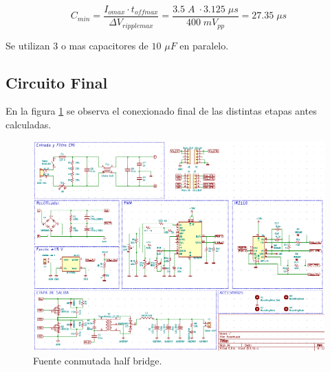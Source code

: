 \documentclass[11pt, a4paper]{article}
\begin{document}
\begin{equation}
C_{min} = \frac{I_{omax} \cdot t_{offmax}}{\Delta V_{ripplemax}} = \frac{3.5 \; A \; \cdot 3.125 \; \mu s}{400 \; mV_{pp}} = 27.35 \; \mu s
\label{CO}
\end{equation} 

Se utilizan 3 o mas capacitores de $10$ $\mu F$ en paralelo.

\subsection{Circuito Final}
En la figura \ref{fuente} se observa el conexionado final de las distintas etapas antes calculadas.

\begin{figure}[H]
	\centering
	\includegraphics[angle = 90, height = 19 cm]{Imagenes/Circuito}
	\caption{Fuente conmutada half bridge.}
	\label{fuente}
\end{figure}
\end{document}
